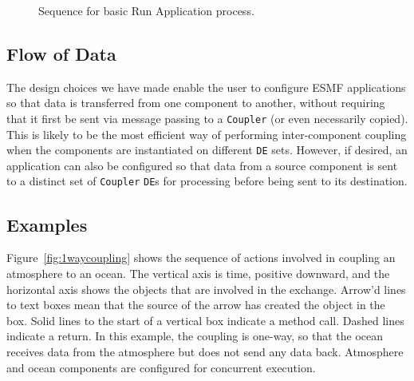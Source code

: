 \begin{figure}
\caption[{Basic Run Application}]{Sequence for basic Run Application process.\\}
\label{fig:RunApplicationDiagram}
\end{figure}

\subsection{Flow of Data}
\label{sec:dataflow}
The design choices we have made enable the user to configure ESMF
applications so that data is transferred from one component to another, 
without requiring that it first be sent via message passing to a
{\tt Coupler} (or even necessarily
copied).  This is likely to be the most efficient way of performing 
inter-component coupling when the components are instantiated on different
{\tt DE} sets.  However, if desired, an application can also be configured so that
data from a source component is sent to a distinct set of {\tt Coupler} 
{\tt DE}s for processing before being sent to its destination.

\subsection{Examples}

Figure~\ref{fig:1waycoupling} shows the sequence of actions involved
in coupling an atmosphere to an ocean.  The vertical axis is time, positive
downward, and the horizontal axis shows the objects that are involved in the
exchange.  Arrow'd lines to text boxes mean that the source of the arrow has 
created the object in the box.  Solid lines to the start of a vertical
box indicate a method call.  Dashed lines indicate a return.  
In this example, the coupling is one-way, so that the ocean 
receives data from the atmosphere but does not send any data back.  Atmosphere
and ocean components are configured for concurrent execution.

